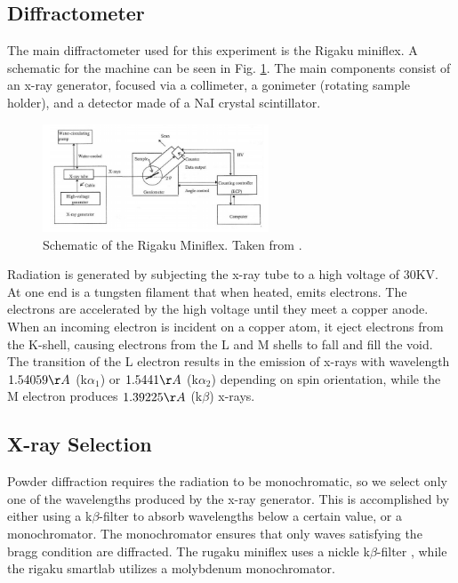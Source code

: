 \documentclass[12pt]{article}
\begin{document}
\subsection{Diffractometer}

The main diffractometer used for this experiment is the Rigaku miniflex. A schematic for the machine can be seen in Fig. \ref{fig:miniflex}. The main components consist of an x-ray generator, focused via a collimeter, a gonimeter (rotating sample holder), and a detector made of a NaI crystal scintillator. 

\begin{figure}[h!]\centering
 \quad \includegraphics[width=0.6\textwidth]{miniflex}
\caption{Schematic of the Rigaku Miniflex. Taken from  \cite{manual}.}
\label{fig:miniflex}
\end{figure} 

\noindent
Radiation is generated by subjecting the x-ray tube to a high voltage of 30KV. At one end is a tungsten filament that when heated, emits electrons. The electrons are accelerated by the high voltage until they meet a copper anode. When an incoming electron is incident on a copper atom, it eject electrons from the K-shell, causing electrons from the L and M shells to fall and fill the void. The transition of the L electron results in the emission of x-rays with wavelength $1.54059\AA$ (k$\alpha_1$) or $1.5441\AA$ (k$\alpha_2$) depending on spin orientation, while the M electron produces $1.39225\AA$ (k$\beta$) x-rays.

\subsection{X-ray Selection}

Powder diffraction requires the radiation to be monochromatic, so we select only one of the wavelengths produced by the x-ray generator. This is accomplished by either using a k$\beta$-filter to absorb wavelengths below a certain value, or a monochromator. The monochromator ensures that only waves satisfying the bragg condition are diffracted. The rugaku miniflex uses a nickle k$\beta$-filter , while the rigaku smartlab utilizes a molybdenum monochromator.
\end{document}
